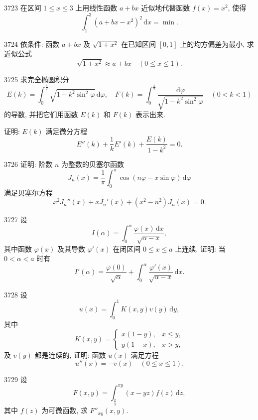 \begin{prob}[M]{3723}
在区间 $1 \leqslant x \leqslant 3$ 上用线性函数 $a + bx$ 近似地代替函数 $f(x) = x^2$, 使得
\[
\int_1^3 (a + bx - x^2)^2 \,\mathrm{d}x = \min.
\]
\end{prob}

\begin{prob}[M]{3724}
依条件: 函数 $a + bx$ 及 $\sqrt{1 + x^2}$ 在已知区间 $[0, 1]$ 上的均方偏差为最小, 求近似公式
\[
\sqrt{1 + x^2} \approx a + bx \quad (0 \leqslant x \leqslant 1).
\]
\end{prob}

\begin{prob}[L]{3725}
求完全椭圆积分
\[
E(k) = \int_0^{\frac{\pi}{2}} \sqrt{1 - k^2 \sin^2 \varphi} \,\mathrm{d}\varphi, \quad F(k) = \int_0^{\frac{\pi}{2}} \frac{\mathrm{d}\varphi}{\sqrt{1 - k^2 \sin^2 \varphi}} \quad (0 < k < 1)
\]
的导数, 并把它们用函数 $E(k)$ 和 $F(k)$ 表示出来.

证明: $E(k)$ 满足微分方程
\[
E''(k) + \frac{1}{k} E'(k) + \frac{E(k)}{1 - k^2} = 0.
\]
\end{prob}

\begin{prob}[M]{3726}
证明: 阶数 $n$ 为整数的贝塞尔函数
\[
J_n(x) = \frac{1}{\pi} \int_0^\pi \cos(n\varphi - x \sin \varphi) \,\mathrm{d}\varphi
\]
满足贝塞尔方程
\[
x^2 J_n''(x) + x J_n'(x) + (x^2 - n^2) J_n(x) = 0.
\]
\end{prob}

\begin{prob}[M]{3727}
设
\[
I(\alpha) = \int_0^\alpha \frac{\varphi(x) \,\mathrm{d}x}{\sqrt{\alpha - x}},
\]
其中函数 $\varphi(x)$ 及其导数 $\varphi'(x)$ 在闭区间 $0 \leqslant x \leqslant a$ 上连续. 证明: 当 $0 < \alpha < a$ 时有
\[
I'(\alpha) = \frac{\varphi(0)}{\sqrt{\alpha}} + \int_0^\alpha \frac{\varphi'(x)}{\sqrt{\alpha - x}} \,\mathrm{d}x.
\]
\end{prob}

\begin{prob}[M]{3728}
设
\[
u(x) = \int_0^1 K(x, y) v(y) \,\mathrm{d}y,
\]
其中
\[
K(x, y) = \begin{cases} x(1 - y), & x \leqslant y, \\ y(1 - x), & x > y, \end{cases}
\]
及 $v(y)$ 都是连续的, 证明: 函数 $u(x)$ 满足方程
\[
u''(x) = -v(x) \quad (0 \leqslant x \leqslant 1).
\]
\end{prob}

\begin{prob}[M]{3729}
设
\[
F(x, y) = \int_{\frac{x}{y}}^{xy} (x - yz) f(z) \,\mathrm{d}z,
\]
其中 $f(z)$ 为可微函数, 求 $F''_{xy}(x, y)$.
\end{prob}

